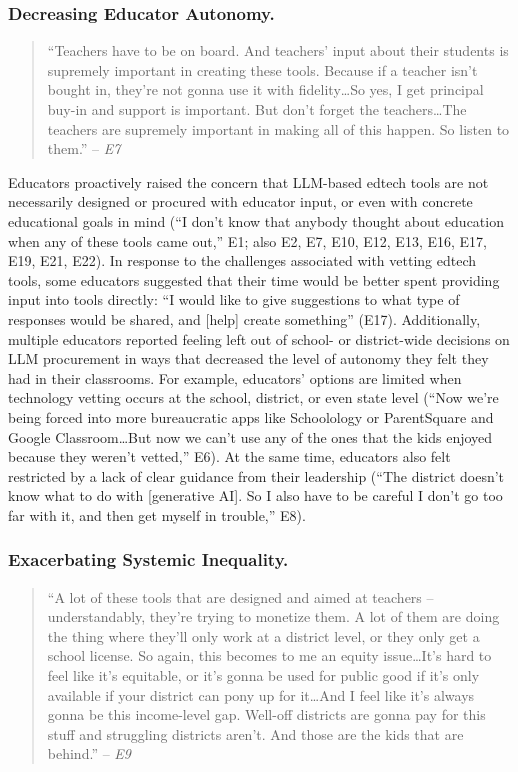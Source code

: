 \subsubsection*{Decreasing Educator Autonomy.}
\begin{quote}
    ``Teachers have to be on board. And teachers’ input about their students is supremely important in creating these tools. Because if a teacher isn’t bought in, they’re not gonna use it with fidelity\ldots So yes, I get principal buy-in and support is important. But don't forget the teachers\ldots The teachers are supremely important in making all of this happen. So listen to them.'' -- \textit{E7}
\end{quote}

\noindent Educators proactively raised the concern that LLM-based edtech tools are not necessarily designed or procured with educator input, or even with concrete educational goals in mind (``I don't know that anybody thought about education when any of these tools came out,'' E1; also E2, E7, E10, E12, E13, E16, E17, E19, E21, E22). In response to the challenges associated with vetting edtech tools, some educators suggested that their time would be better spent providing input into tools directly: ``I would like to give suggestions to what type of responses would be shared, and [help] create something'' (E17). Additionally, multiple educators reported feeling left out of school- or district-wide decisions on LLM procurement in ways that decreased the level of autonomy they felt they had in their classrooms. For example, educators' options are limited when technology vetting occurs at the school, district, or even state level (``Now we're being forced into more bureaucratic apps like Schoolology or ParentSquare and Google Classroom\ldots But now we can't use any of the ones that the kids enjoyed because they weren't vetted,'' E6). At the same time, educators also felt restricted by a lack of clear guidance from their leadership (``The district doesn't know what to do with [generative AI]. So I also have to be careful I don't go too far with it, and then get myself in trouble,'' E8).  

\subsubsection*{Exacerbating Systemic Inequality.}
\begin{quote}
    ``A lot of these tools that are designed and aimed at teachers -- understandably, they're trying to monetize them. A lot of them are doing the thing where they'll only work at a district level, or they only get a school license. So again, this becomes to me an equity issue\ldots It's hard to feel like it's equitable, or it's gonna be used for public good if it's only available if your district can pony up for it\ldots And I feel like it's always gonna be this income-level gap. Well-off districts are gonna pay for this stuff and struggling districts aren't. And those are the kids that are behind.'' -- \textit{E9}
\end{quote}

